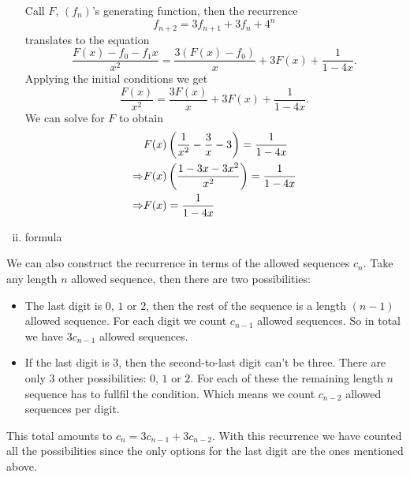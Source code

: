 \documentclass[12pt]{memoir}
\begin{document}
\begin{ptcbr}
\begin{enumerate}[i)]
   Call $F$, $(f_n)$'s generating function, then the recurrence 
   $$f_{n+2}=3f_{n+1}+3f_n+4^n$$
   translates to the equation 
   $$\frac{F(x)-f_0-f_1x}{x^2}=\frac{3(F(x)-f_0)}{x}+3F(x)+\frac{1}{1-4x}.$$
   Applying the initial conditions we get 
   $$\frac{F(x)}{x^2}=\frac{3F(x)}{x}+3F(x)+\frac{1}{1-4x}.$$
   We can solve for $F$ to obtain 
   \begin{align*}
      &F(x)\left(\frac{1}{x^2}-\frac{3}{x}-3\right)=\frac{1}{1-4x}\\
      \Rightarrow&F(x)\left(\frac{1-3x-3x^2}{x^2}\right)=\frac{1}{1-4x}\\
      \Rightarrow&F(x)=\frac{1}{1-4x}\\
   \end{align*}
   \item formula
\end{enumerate}
\end{ptcbr}

\begin{ptcb}
   We can also construct the recurrence in terms of the allowed sequences $c_n$. Take any length $n$ allowed sequence, then there are two possibilities:
   \begin{itemize}
      \itemsep=-0.4em
      \item The last digit is $0$, $1$ or $2$, then the rest of the sequence is a length $(n-1)$ allowed sequence. For each digit we count $c_{n-1}$ allowed sequences. So in total we have $3c_{n-1}$ allowed sequences.
      \item If the last digit is $3$, then the second-to-last digit can't be three. There are only $3$ other possibilities: $0$, $1$ or $2$. For each of these the remaining length $n$ sequence has to fullfil the condition. Which means we count $c_{n-2}$ allowed sequences per digit.
   \end{itemize}
   This total amounts to $c_n=3c_{n-1}+3c_{n-2}$. With this recurrence we have counted all the possibilities since the only options for the last digit are the ones mentioned above. 
\end{ptcb}
\end{document}
